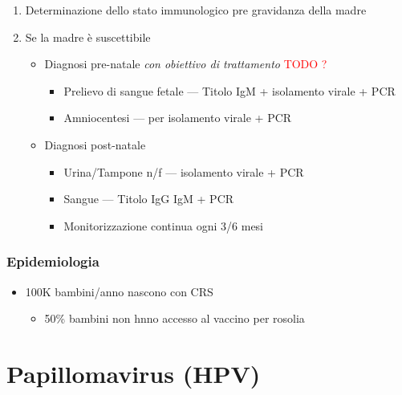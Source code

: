 \documentclass[italian,]{article}
\providecommand{\tightlist}{%
  \setlength{\itemsep}{0pt}\setlength{\parskip}{0pt}}
\newcommand{\TODO}[1]{\textcolor{red}{\textsf{\footnotesize{TODO #1}}}} %
\begin{document}
\begin{enumerate}
\def\labelenumi{\arabic{enumi}.}
\tightlist
\item
  Determinazione dello stato immunologico pre gravidanza della madre
\item
  Se la madre è suscettibile

  \begin{itemize}
  \tightlist
  \item
    Diagnosi pre-natale \emph{con obiettivo di trattamento} \TODO{?}

    \begin{itemize}
    \tightlist
    \item
      Prelievo di sangue fetale --- Titolo IgM + isolamento virale + PCR
    \item
      Amniocentesi --- per isolamento virale + PCR
    \end{itemize}
  \item
    Diagnosi post-natale

    \begin{itemize}
    \tightlist
    \item
      Urina/Tampone n/f --- isolamento virale + PCR
    \item
      Sangue --- Titolo IgG IgM + PCR
    \item
      Monitorizzazione continua ogni 3/6 mesi
    \end{itemize}
  \end{itemize}
\end{enumerate}

\hypertarget{epidemiologia-4}{%
\subsubsection{Epidemiologia}\label{epidemiologia-4}}

\begin{itemize}
\tightlist
\item
  100K bambini/anno nascono con CRS

  \begin{itemize}
  \tightlist
  \item
    50\% bambini non hnno accesso al vaccino per rosolia
  \end{itemize}
\end{itemize}

\hypertarget{papillomavirus-hpv}{%
\section{Papillomavirus (HPV)}\label{papillomavirus-hpv}}
\end{document}
